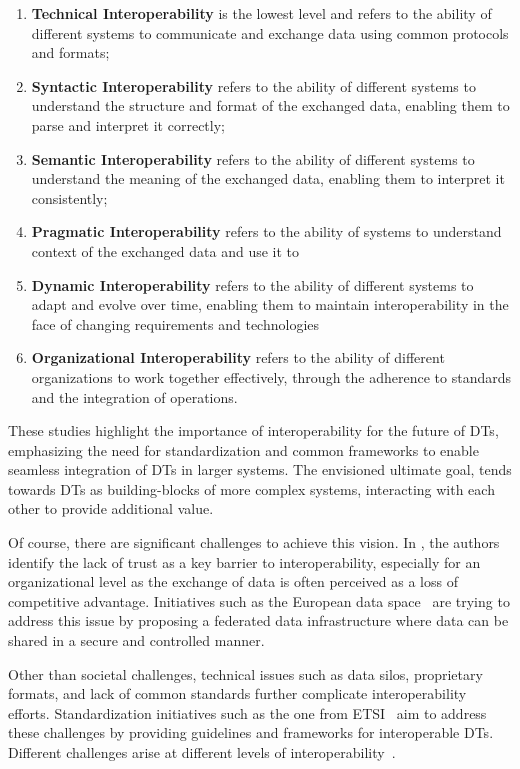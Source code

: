 \begin{enumerate}
    \item \textbf{Technical Interoperability} is the lowest level and refers to the ability of different systems to communicate and exchange data using common protocols and formats;
    \item \textbf{Syntactic Interoperability} refers to the ability of different systems to understand the structure and format of the exchanged data, enabling them to parse and interpret it correctly;
    \item \textbf{Semantic Interoperability} refers to the ability of different systems to understand the meaning of the exchanged data, enabling them to interpret it consistently;
    \item \textbf{Pragmatic Interoperability} refers to the ability of systems to understand context of the exchanged data and use it to 
    \item \textbf{Dynamic Interoperability} refers to the ability of different systems to adapt and evolve over time, enabling them to maintain interoperability in the face of changing requirements and technologies
    \item \textbf{Organizational Interoperability} refers to the ability of different organizations to work together effectively, through the adherence to standards and the integration of operations. 
\end{enumerate}
%

These studies highlight the importance of interoperability for the future of \acp{DT}, emphasizing the need for standardization and common frameworks to enable seamless integration of \acp{DT} in larger systems. 
%
The envisioned ultimate goal, tends towards \acp{DT} as building-blocks of more complex systems, interacting with each other to provide additional value. 

Of course, there are significant challenges to achieve this vision.
%
In \cite{Klar_Arvidsson_Angelakis_2024}, the authors identify the lack of trust as a key barrier to interoperability, especially for an organizational level as the exchange of data is often perceived as a loss of competitive advantage.
%
Initiatives such as the European data space~\cite{Braud_Fromentoux_Radier_Le_Grand_2021} are trying to address this issue by proposing a federated data infrastructure where data can be shared in a secure and controlled manner.

Other than societal challenges, technical issues such as data silos, proprietary formats, and lack of common standards further complicate interoperability efforts.
%
Standardization initiatives such as the one from \ac{ETSI}~\cite{etsi_TR_103844_v1.1.1_2023} aim to address these challenges by providing guidelines and frameworks for interoperable \acp{DT}.
%
Different challenges arise at different levels of interoperability~\cite{Klar_Arvidsson_Angelakis_2024}.

